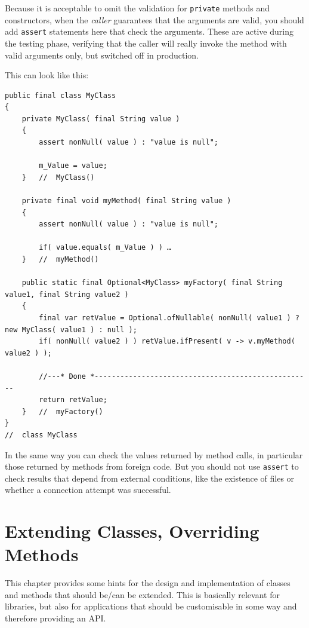 \documentclass[11pt,a4paper, titlepage, parskip=half, headsepline, footsepline, cleardoublepage=current, headheight=1cm]{scrbook}
\begin{document}
Because it is acceptable to omit the validation for \lstinline|private| methods and constructors, when the \textit{caller} guarantees that the arguments are valid, you should add \lstinline|assert| statements here that check the arguments\autocite{ORACLE_DOC_ASSERTIONS}. These are active during the testing phase, verifying that the caller will really invoke the method with valid arguments only, but switched off in production.

This can look like this:
\begin{lstlisting}
public final class MyClass
{
    private MyClass( final String value )
    {
        assert nonNull( value ) : "value is null";
        
        m_Value = value;
    }   //  MyClass()
    
    private final void myMethod( final String value )
    {
        assert nonNull( value ) : "value is null";
        
        if( value.equals( m_Value ) ) …
    }   //  myMethod()
    
    public static final Optional<MyClass> myFactory( final String value1, final String value2 )
    {
    	final var retValue = Optional.ofNullable( nonNull( value1 ) ? new MyClass( value1 ) : null ); 
    	if( nonNull( value2 ) ) retValue.ifPresent( v -> v.myMethod( value2 ) );
    	
    	//---* Done *---------------------------------------------------
    	return retValue;
    }   //  myFactory()
}
//  class MyClass
\end{lstlisting}

In the same way you can check the values returned by method calls, in particular those returned by methods from foreign code. But you should not use \lstinline|assert| to check results that depend from external conditions, like the existence of files or whether a connection attempt was successful.


\section{Extending Classes, Overriding Methods}\label{sec:ExtendingClassesOverridingMethods}
This chapter provides some hints for the design and implementation of classes and methods that should be/can be extended. This is basically relevant for libraries, but also for applications that should be customisable in some way and therefore providing an API.
\end{document}
